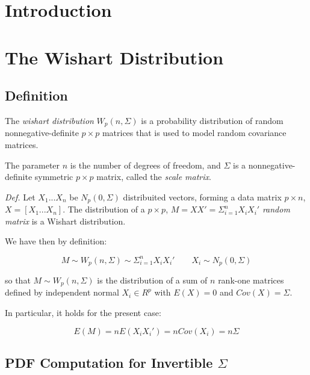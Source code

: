 \documentclass[12pt,openright,twoside,a4paper]{book}
\begin{document}
\frontmatter

\tableofcontents

\chapter{Introduction}

\mainmatter

\chapter{The Wishart Distribution}

\section{Definition}

The \textit{wishart distribution} $ W_p(n, \Sigma)$ is a probability distribution of random nonnegative-definite $p\times p$ matrices that is used to model random covariance matrices.

The parameter $n$ is the number of degrees of freedom, and $\Sigma$ is a nonnegative-definite symmetric $p\times p$ matrix, called the \textit{scale matrix}.


\textit{Def.} Let $X_1...X_n$ be $N_p(0,\Sigma)$ distribuited vectors, forming a data matrix $p\times n$, $X=[X_1...X_n]$.
The distribution of  a $p\times p$, $M=XX'=\Sigma^n_{i=1}X_iX_i'$ \textit{random matrix}  is a Wishart distribution. \cite{AMS}

We have then by definition:

\begin{equation}
M\sim W_p(n, \Sigma)\sim\Sigma^n_{i=1}X_iX_i' \qquad X_i\sim N_p(0,\Sigma)   
\label{wsim}
\end{equation}


so that $M\sim W_p(n, \Sigma)$  is the distribution of a sum of $n$ rank-one matrices defined by independent normal $X_i \in R^p$ with $E(X)=0$ and $Cov(X)=\Sigma$.

In particular, it holds for the present case:

\begin{equation}
E(M)=nE(X_iX_i') = nCov(X_i) = n\Sigma
\end{equation}

\section{PDF Computation for Invertible $\Sigma$}
\end{document}
